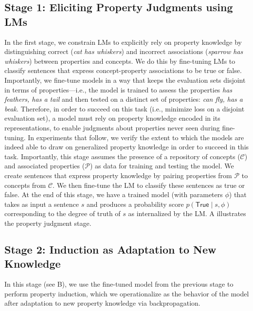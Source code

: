\documentclass[10pt,letterpaper]{article}
\newcommand{\concepts}{\mathcal{C}}
\newcommand{\properties}{\mathcal{P}}
\newcommand{\true}{\mathsf{True}}
\begin{document}
\subsection{Stage 1: Eliciting Property Judgments using LMs}
In the first stage, we constrain LMs to explicitly rely on property knowledge by distinguishing correct (\textit{cat has whiskers}) and incorrect associations (\textit{sparrow has whiskers}) between properties and concepts. 
We do this by fine-tuning LMs to classify sentences that express concept-property associations to be true or false. Importantly, we fine-tune models in a way that keeps the evaluation sets disjoint in terms of properties---i.e., the model is trained to assess the properties \textit{has feathers, has a tail} and then tested on a distinct set of properties: \textit{can fly, has a beak}.
Therefore, in order to succeed on this task (i.e., minimize loss on a disjoint evaluation set), a model must rely on property knowledge encoded in its representations, to enable judgments about properties never seen during fine-tuning.
In experiments that follow, we verify the extent to which the models are indeed able to draw on generalized property knowledge in order to succeed in this task. 
Importantly, this stage assumes the presence of a repository of concepts ($\concepts$) and associated properties ($\properties$) as data for training and testing the model. 
We create sentences that express property knowledge by pairing properties from $\properties$ to concepts from $\concepts$. We then fine-tune the LM to classify these sentences as true or false. At the end of this stage, we have a trained model (with parameters $\phi$) that takes as input a sentence $s$ and produces a probability score $p(\true \mid s, \phi)$ corresponding to the degree of truth of $s$ as internalized by the LM.
A illustrates the property judgment stage.

\subsection{Stage 2: Induction as Adaptation to New Knowledge}
In this stage (see B), we use the fine-tuned model from the previous stage to perform property induction, which we operationalize as the behavior of the model after adaptation to new property knowledge via backpropagation.
\end{document}
